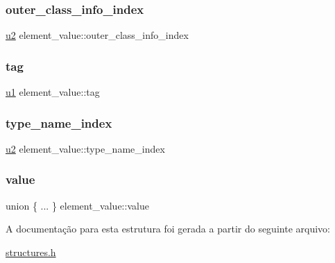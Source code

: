 \subsubsection{\texorpdfstring{outer\+\_\+class\+\_\+info\+\_\+index}{outer\_class\_info\_index}}
{\footnotesize\ttfamily \hyperlink{lista__operandos_8h_a732cde1300aafb73b0ea6c2558a7a54f}{u2} element\+\_\+value\+::outer\+\_\+class\+\_\+info\+\_\+index}

\mbox{\label{structelement__value_a2664460cf3cbd50f7116dcc6fc5dc049}} 
\subsubsection{\texorpdfstring{tag}{tag}}
{\footnotesize\ttfamily \hyperlink{lista__operandos_8h_ad9f4cdb6757615aae2fad89dab3c5470}{u1} element\+\_\+value\+::tag}

\mbox{\label{structelement__value_ad1925807cc4b5a79fa7fa56d46462ecb}} 
\subsubsection{\texorpdfstring{type\+\_\+name\+\_\+index}{type\_name\_index}}
{\footnotesize\ttfamily \hyperlink{lista__operandos_8h_a732cde1300aafb73b0ea6c2558a7a54f}{u2} element\+\_\+value\+::type\+\_\+name\+\_\+index}

\mbox{\label{structelement__value_a4e0b4dd7c57280a3c485e3f5d03bee80}} 
\subsubsection{\texorpdfstring{value}{value}}
{\footnotesize\ttfamily union \{ ... \}   element\+\_\+value\+::value}



A documentação para esta estrutura foi gerada a partir do seguinte arquivo\+:\begin{DoxyCompactItemize}
\item 
\hyperlink{structures_8h}{structures.\+h}\end{DoxyCompactItemize}
